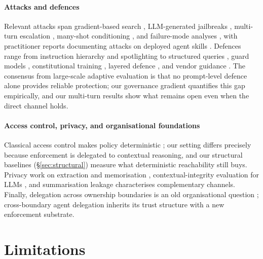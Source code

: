 \documentclass[10pt,a4paper]{article}
\begin{document}
\paragraph{Attacks and defences} Relevant attacks span gradient-based search \cite{zou2023universal,liu2024autodan}, LLM-generated jailbreaks \cite{chao2025pair,zeng2024pap,mehrotra2024tap}, multi-turn escalation \cite{russinovich2025crescendo}, many-shot conditioning \cite{anil2024manyshot}, and failure-mode analyses \cite{wei2023jailbroken}, with practitioner reports documenting attacks on deployed agent skills \cite{rehberger2026scaryskills}. Defences range from instruction hierarchy \cite{wallace2024instruction} and spotlighting \cite{hines2024spotlighting} to structured queries \cite{chen2025struq}, guard models \cite{inan2023llamaguard,rebedea2023nemo}, constitutional training \cite{bai2022constitutional}, layered defence \cite{ghosh2025safety}, and vendor guidance \cite{meta2025ruletwo,anthropic2025promptinjection,google2025promptinjection,owasp2025llm}. The consensus from large-scale adaptive evaluation \cite{nasr2025attacker} is that no prompt-level defence alone provides reliable protection; our governance gradient quantifies this gap empirically, and our multi-turn results show what remains open even when the direct channel holds.

\paragraph{Access control, privacy, and organisational foundations} Classical access control makes policy deterministic \cite{bell1973secure,denning1976lattice,dennis1966programming}; our setting differs precisely because enforcement is delegated to contextual reasoning, and our structural baselines (\S\ref{sec:structural}) measure what deterministic reachability still buys. Privacy work on extraction and memorisation \cite{carlini2021extracting,carlini2023quantifying,dwork2006differential}, contextual-integrity evaluation for LLMs \cite{li2023privacyllm}, and summarisation leakage \cite{patil2025sumleaks} characterises complementary channels. Finally, delegation across ownership boundaries is an old organisational question \cite{coase1937firm,williamson1975markets,granovetter1973weak}; cross-boundary agent delegation inherits its trust structure with a new enforcement substrate.

\section{Limitations}
\end{document}
